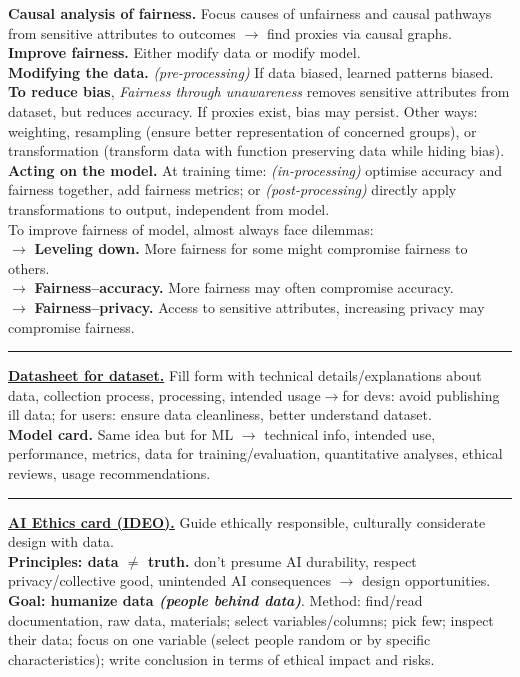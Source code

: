 \documentclass[8pt, a4paper]{extarticle}
\makeatletter
\renewcommand{\hline}{\noalign{\vskip 2px}\hrule\@height\arrayrulewidth\@width\linewidth\noalign{\vskip 2px}}
\makeatother
\begin{document}
\begin{minipage}[t]{0.49\textwidth}
{\begin{minipage}[t]{1\textwidth}
			\textbf{Causal analysis of fairness.} Focus causes of unfairness and causal pathways from sensitive attributes to outcomes \(\rightarrow\) find proxies via causal graphs.\\
			\textbf{Improve fairness.} Either modify data or modify model.\\
			\textbf{Modifying the data.} \textit{(pre-processing)} If data biased, learned patterns biased. \textbf{To reduce bias}, \textit{Fairness through unawareness} removes sensitive attributes from dataset, but reduces accuracy. If proxies exist, bias may persist. Other ways: weighting, resampling (ensure better representation of concerned groups), or transformation (transform data with function preserving data while hiding bias).\\
			\textbf{Acting on the model.} At training time: \textit{(in-processing)} optimise accuracy and fairness together, add fairness metrics; or \textit{(post-processing)} directly apply transformations to output, independent from model.\\
			To improve fairness of model, almost always face dilemmas:\\
			$\rightarrow$ \textbf{Leveling down.} More fairness for some might compromise fairness to others.\\
			$\rightarrow$ \textbf{Fairness--accuracy.} More fairness may often compromise accuracy.\\
			$\rightarrow$ \textbf{Fairness--privacy.} Access to sensitive attributes, increasing privacy may compromise fairness.\hline
			\ul{\textbf{Datasheet for dataset.}} Fill form with technical details/explanations about data, collection process, processing, intended usage$\rightarrow$for devs: avoid publishing ill data; for users: ensure data cleanliness, better understand dataset.\\
			\textbf{Model card.} Same idea but for ML $\rightarrow$ technical info, intended use, performance, metrics, data for training/evaluation, quantitative analyses, ethical reviews, usage recommendations.\hline
			\ul{\textbf{AI Ethics card (IDEO).}} Guide ethically responsible, culturally considerate design with data. \\\textbf{Principles: data $\neq$ truth.} don't presume AI durability, respect privacy/collective good, unintended AI consequences $\rightarrow$ design opportunities. \textbf{Goal: humanize data \textit{(people behind data)}}. Method: find/read documentation, raw data, materials; select variables/columns; pick few; inspect their data; focus on one variable (select people random or by specific characteristics); write conclusion in terms of ethical impact and risks.

\end{minipage}}
\end{minipage}
\end{document}
